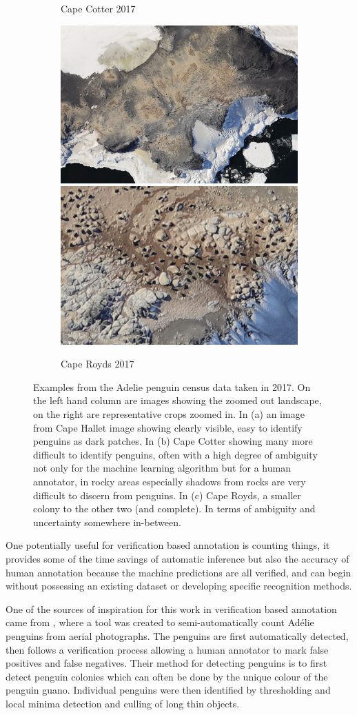 \begin{figure}[H]
\begin{subfigure}[t]{1.0\linewidth}
  \caption{Cape Cotter 2017}
\end{subfigure}
\begin{subfigure}[t]{1.0\linewidth}
  \includegraphics[width=0.475\linewidth]{figures/annotation/penguin/royds_large.jpg}
  \hfill
  \includegraphics[width=0.475\linewidth]{figures/annotation/penguin/royds.jpg}
  \caption{Cape Royds 2017}
\end{subfigure}

\caption{Examples from the Adelie penguin census data taken in 2017. On the left hand column are images showing the zoomed out landscape, on the right are representative crops zoomed in.  In (a) an image from Cape Hallet image showing clearly visible, easy to identify penguins as dark patches. In (b) Cape Cotter showing many more difficult to identify penguins, often with a high degree of ambiguity not only for the machine learning algorithm but for a human annotator, in rocky areas especially shadows from rocks are very difficult to discern from penguins. In (c) Cape Royds, a smaller colony to the other two (and complete). In terms of ambiguity and uncertainty somewhere in-between. }
\label {fig:penguin_examples}
\end{figure}


One potentially useful for verification based annotation is counting things, it provides some of the time savings of automatic inference but also the accuracy of human annotation because the machine predictions are all verified, and can begin without possessing an existing dataset or developing specific recognition methods. 

One of the sources of inspiration for this work in verification based annotation came from \cite{McNeill2011}, where a tool was created to semi-automatically count Adélie penguins from aerial photographs. The penguins are first automatically detected, then follows a verification process allowing a human annotator to mark false positives and false negatives. Their method for detecting penguins is to first detect penguin colonies which can often be done by the unique colour of the penguin guano. Individual penguins were then identified by thresholding and local minima detection and culling of long thin objects. 

